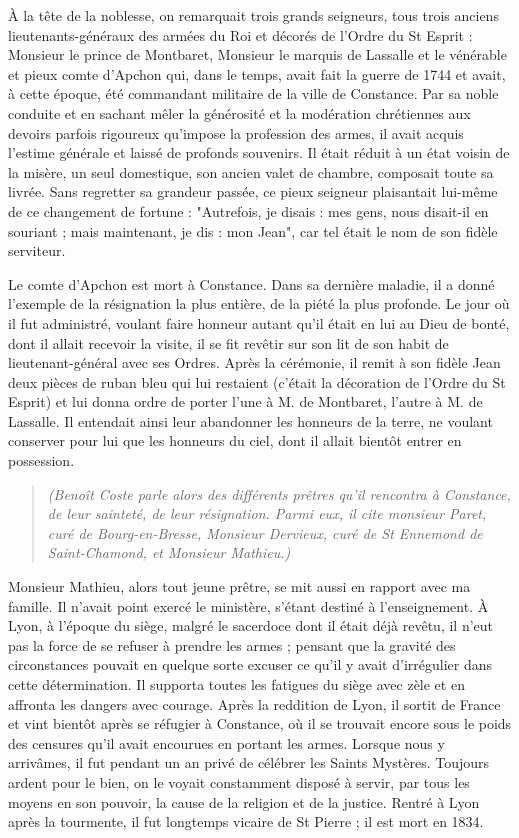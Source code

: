 \documentclass[11pt,a4paper]{report}
\begin{document}
À la tête de la noblesse, on remarquait trois grands seigneurs, tous trois anciens lieutenants-généraux des armées du Roi et décorés de l'Ordre du St Esprit : Monsieur le prince de Montbaret, Monsieur le marquis de Lassalle et le vénérable et pieux comte d'Apchon qui, dans le temps, avait fait la guerre de 1744 et avait, à cette époque, été commandant militaire de la ville de Constance. Par sa noble conduite et en sachant mêler la générosité et la modération chrétiennes aux devoirs parfois rigoureux qu'impose la profession des armes, il avait acquis l'estime générale et laissé de profonds souvenirs. Il était réduit à un état voisin de la misère, un seul domestique, son ancien valet de chambre, composait toute sa livrée. Sans regretter sa grandeur passée, ce pieux seigneur plaisantait lui-même de ce changement de fortune : "Autrefois, je disais : mes gens, nous disait-il en souriant ; mais maintenant, je dis : mon Jean", car tel était le nom de son fidèle serviteur.

Le comte d'Apchon est mort à Constance. Dans sa dernière maladie, il a donné l'exemple de la résignation la plus entière, de la piété la plus profonde. Le jour où il fut administré, voulant faire honneur autant qu'il était en lui au Dieu de bonté, dont il allait recevoir la visite, il se fit revêtir sur son lit de son habit de lieutenant-général avec ses Ordres. Après la cérémonie, il remit à son fidèle Jean deux pièces de ruban bleu qui lui restaient (c'était la décoration de l'Ordre du St Esprit) et lui donna ordre de porter l'une à M. de Montbaret, l'autre à M. de Lassalle. Il entendait ainsi leur abandonner les honneurs de la terre, ne voulant conserver pour lui que les honneurs du ciel, dont il allait bientôt entrer en possession.

\begin{quote}
\textit{(Benoît Coste parle alors des différents prêtres qu'il rencontra à Constance, de leur sainteté, de leur résignation. Parmi eux, il cite monsieur Paret, curé de Bourg-en-Bresse, Monsieur Dervieux, curé de St Ennemond de Saint-Chamond, et Monsieur Mathieu.)}
\end{quote}

Monsieur Mathieu, alors tout jeune prêtre, se mit aussi en rapport avec ma famille. Il n'avait point exercé le ministère, s'étant destiné à l'enseignement. À Lyon, à l'époque du siège, malgré le sacerdoce dont il était déjà revêtu, il n'eut pas la force de se refuser à prendre les armes ; pensant que la gravité des circonstances pouvait en quelque sorte excuser ce qu'il y avait d'irrégulier dans cette détermination. Il supporta toutes les fatigues du siège avec zèle et en affronta les dangers avec courage. Après la reddition de Lyon, il sortit de France et vint bientôt après se réfugier à Constance, où il se trouvait encore sous le poids des censures qu'il avait encourues en portant les armes. Lorsque nous y arrivâmes, il fut pendant un an privé de célébrer les Saints Mystères. Toujours ardent pour le bien, on le voyait constamment disposé à servir, par tous les moyens en son pouvoir, la cause de la religion et de la justice. Rentré à Lyon après la tourmente, il fut longtemps vicaire de St Pierre ; il est mort en 1834.
\end{document}

